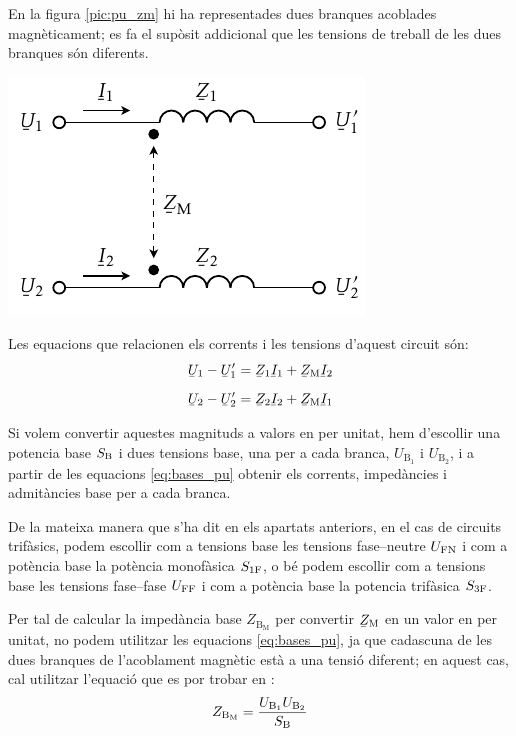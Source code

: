 En la figura \vref{pic:pu_zm} hi ha representades dues branques acoblades magn\`{e}ticament; es fa el sup\`{o}sit addicional que les tensions de treball de les dues branques s\'{o}n diferents.

\begin{center}
    \includegraphics{Imatges/Cap-Fonaments-pu-ZM.pdf}
    \label{pic:pu_zm}
\end{center}

Les equacions que relacionen els corrents i les tensions d'aquest circuit s\'{o}n:
\begin{subequations}
\begin{align}
    \cmplx{U}_1 - \cmplx{U}'_1 &= \cmplx{Z}_1 \cmplx{I}_1 + \cmplx{Z}\ped{M} \cmplx{I}_2   \\[2mm]
    \cmplx{U}_2 - \cmplx{U}'_2 &= \cmplx{Z}_2 \cmplx{I}_2 + \cmplx{Z}\ped{M} \cmplx{I}_1
\end{align}
\end{subequations}

Si volem convertir aquestes magnituds a valors en per unitat, hem d'escollir  una potencia base $S_\mathrm{B}$ i dues tensions base, una  per a cada branca, $U_{\text{B}_1}$ i  $U_{\text{B}_2}$, i a partir de les equacions \eqref{eq:bases_pu} obtenir els corrents, imped\`{a}ncies i admit\`{a}ncies base per a cada branca.

De la mateixa manera que s'ha dit en els apartats anteriors, en el cas de circuits trif\`{a}sics, podem escollir com a tensions base les tensions fase--neutre $U_\mathrm{FN}$ i com a pot\`{e}ncia base la pot\`{e}ncia  monof\`{a}sica $S_\mathrm{1F}$, o b\'{e} podem escollir com a tensions base les tensions fase--fase $U_\mathrm{FF}$ i com a pot\`{e}ncia base la potencia trif\`{a}sica $S_\mathrm{3F}$.


Per tal de calcular la imped\`{a}ncia base $Z_{\text{B}_\text{M}}$ per convertir $\cmplx{Z}\ped{M}$ en un valor en per unitat, no podem utilitzar les equacions \eqref{eq:bases_pu}, ja que cadascuna de les dues branques de l'acoblament magn\`{e}tic est\`{a} a una tensi\'{o} diferent; en aquest cas, cal utilitzar l'equaci\'{o} que es por trobar en \cite{TLE}:
\begin{equation}
    Z_{\text{B}_\text{M}} = \frac{U_{\text{B}_1} U_{\text{B}_2}} {S_\mathrm{B}}
\end{equation}

